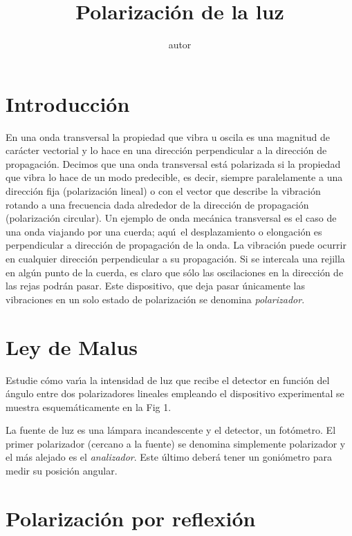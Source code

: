 \documentclass[epj]{svjour}
\def \practica {Polarizaci\'on de la luz}
\begin{document}
\title{\practica}    
\author{autor}

\maketitle

\section{Introducci\'on}
En una onda transversal la propiedad que vibra u oscila es una magnitud de 
car\'acter vectorial y lo hace en una direcci\'on perpendicular a la 
direcci\'on de propagaci\'on. Decimos que una onda transversal est\'a 
polarizada si la propiedad que vibra lo hace de un modo predecible, es decir,
siempre paralelamente a una direcci\'on fija (polarizaci\'on lineal) o con el
vector que describe la vibraci\'on rotando a una frecuencia dada alrededor de
la direcci\'on de propagaci\'on (polarizaci\'on circular). Un ejemplo de onda
mec\'anica transversal es el caso de una onda viajando por una cuerda; aqu\'\i\
el desplazamiento o elongaci\'on es perpendicular a direcci\'on de 
propagaci\'on de la onda. La vibraci\'on puede ocurrir en cualquier direcci\'on
perpendicular a su propagaci\'on. Si se intercala una rejilla en alg\'un punto
de la cuerda, es claro que s\'olo las oscilaciones en la direcci\'on de las 
rejas podr\'an pasar. Este dispositivo, que deja pasar \'unicamente las 
vibraciones en un solo estado de polarizaci\'on se denomina {\it polarizador}.

\section{Ley de Malus}
Estudie c\'omo var\'\i a la intensidad de luz que recibe el detector en 
funci\'on del \'angulo entre dos polarizadores lineales empleando el 
dispositivo experimental se muestra esquem\'aticamente en la Fig 1.

La fuente de luz es una l\'ampara incandescente y el detector, un fot\'ometro.
El primer polarizador (cercano a la fuente) se denomina simplemente polarizador
y el m\'as alejado es el {\it analizador}. Este \'ultimo deber\'a tener un 
goni\'ometro para medir su posici\'on angular.

\section{Polarizaci\'on por reflexi\'on}
\end{document}
